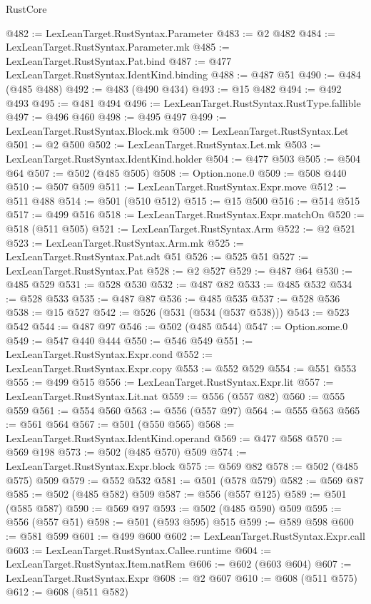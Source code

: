 \begin{lexlean}{RustCore}
\begin{coremodule}
@482 := LexLeanTarget.RustSyntax.Parameter
@483 := @2 @482
@484 := LexLeanTarget.RustSyntax.Parameter.mk
@485 := LexLeanTarget.RustSyntax.Pat.bind
@487 := @477 LexLeanTarget.RustSyntax.IdentKind.binding
@488 := @487 @51
@490 := @484 (@485 @488)
@492 := @483 (@490 @434)
@493 := @15 @482
@494 := @492 @493
@495 := @481 @494
@496 := LexLeanTarget.RustSyntax.RustType.fallible
@497 := @496 @460
@498 := @495 @497
@499 := LexLeanTarget.RustSyntax.Block.mk
@500 := LexLeanTarget.RustSyntax.Let
@501 := @2 @500
@502 := LexLeanTarget.RustSyntax.Let.mk
@503 := LexLeanTarget.RustSyntax.IdentKind.holder
@504 := @477 @503
@505 := @504 @64
@507 := @502 (@485 @505)
@508 := Option.none.{0}
@509 := @508 @440
@510 := @507 @509
@511 := LexLeanTarget.RustSyntax.Expr.move
@512 := @511 @488
@514 := @501 (@510 @512)
@515 := @15 @500
@516 := @514 @515
@517 := @499 @516
@518 := LexLeanTarget.RustSyntax.Expr.matchOn
@520 := @518 (@511 @505)
@521 := LexLeanTarget.RustSyntax.Arm
@522 := @2 @521
@523 := LexLeanTarget.RustSyntax.Arm.mk
@525 := LexLeanTarget.RustSyntax.Pat.adt @51
@526 := @525 @51
@527 := LexLeanTarget.RustSyntax.Pat
@528 := @2 @527
@529 := @487 @64
@530 := @485 @529
@531 := @528 @530
@532 := @487 @82
@533 := @485 @532
@534 := @528 @533
@535 := @487 @87
@536 := @485 @535
@537 := @528 @536
@538 := @15 @527
@542 := @526 (@531 (@534 (@537 @538)))
@543 := @523 @542
@544 := @487 @97
@546 := @502 (@485 @544)
@547 := Option.some.{0}
@549 := @547 @440 @444
@550 := @546 @549
@551 := LexLeanTarget.RustSyntax.Expr.cond
@552 := LexLeanTarget.RustSyntax.Expr.copy
@553 := @552 @529
@554 := @551 @553
@555 := @499 @515
@556 := LexLeanTarget.RustSyntax.Expr.lit
@557 := LexLeanTarget.RustSyntax.Lit.nat
@559 := @556 (@557 @82)
@560 := @555 @559
@561 := @554 @560
@563 := @556 (@557 @97)
@564 := @555 @563
@565 := @561 @564
@567 := @501 (@550 @565)
@568 := LexLeanTarget.RustSyntax.IdentKind.operand
@569 := @477 @568
@570 := @569 @198
@573 := @502 (@485 @570) @509
@574 := LexLeanTarget.RustSyntax.Expr.block
@575 := @569 @82
@578 := @502 (@485 @575) @509
@579 := @552 @532
@581 := @501 (@578 @579)
@582 := @569 @87
@585 := @502 (@485 @582) @509
@587 := @556 (@557 @125)
@589 := @501 (@585 @587)
@590 := @569 @97
@593 := @502 (@485 @590) @509
@595 := @556 (@557 @51)
@598 := @501 (@593 @595) @515
@599 := @589 @598
@600 := @581 @599
@601 := @499 @600
@602 := LexLeanTarget.RustSyntax.Expr.call
@603 := LexLeanTarget.RustSyntax.Callee.runtime
@604 := LexLeanTarget.RustSyntax.Item.natRem
@606 := @602 (@603 @604)
@607 := LexLeanTarget.RustSyntax.Expr
@608 := @2 @607
@610 := @608 (@511 @575)
@612 := @608 (@511 @582)

\end{coremodule}
\end{lexlean}
